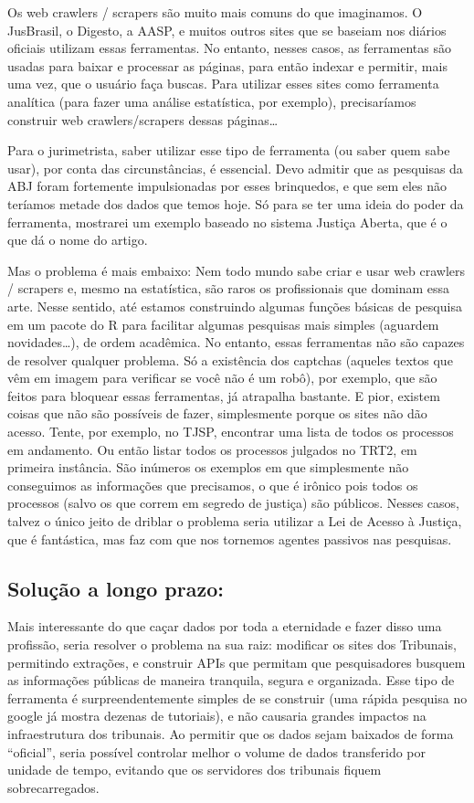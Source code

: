 \documentclass[]{book}
\begin{document}
Os web crawlers / scrapers são muito mais comuns do que imaginamos. O
JusBrasil, o Digesto, a AASP, e muitos outros sites que se baseiam nos
diários oficiais utilizam essas ferramentas. No entanto, nesses casos,
as ferramentas são usadas para baixar e processar as páginas, para então
indexar e permitir, mais uma vez, que o usuário faça buscas. Para
utilizar esses sites como ferramenta analítica (para fazer uma análise
estatística, por exemplo), precisaríamos construir web crawlers/scrapers
dessas páginas\ldots{}

Para o jurimetrista, saber utilizar esse tipo de ferramenta (ou saber
quem sabe usar), por conta das circunstâncias, é essencial. Devo admitir
que as pesquisas da ABJ foram fortemente impulsionadas por esses
brinquedos, e que sem eles não teríamos metade dos dados que temos hoje.
Só para se ter uma ideia do poder da ferramenta, mostrarei um exemplo
baseado no sistema Justiça Aberta, que é o que dá o nome do artigo.

Mas o problema é mais embaixo: Nem todo mundo sabe criar e usar web
crawlers / scrapers e, mesmo na estatística, são raros os profissionais
que dominam essa arte. Nesse sentido, até estamos construindo algumas
funções básicas de pesquisa em um pacote do R para facilitar algumas
pesquisas mais simples (aguardem novidades\ldots{}), de ordem acadêmica.
No entanto, essas ferramentas não são capazes de resolver qualquer
problema. Só a existência dos captchas (aqueles textos que vêm em imagem
para verificar se você não é um robô), por exemplo, que são feitos para
bloquear essas ferramentas, já atrapalha bastante. E pior, existem
coisas que não são possíveis de fazer, simplesmente porque os sites não
dão acesso. Tente, por exemplo, no TJSP, encontrar uma lista de todos os
processos em andamento. Ou então listar todos os processos julgados no
TRT2, em primeira instância. São inúmeros os exemplos em que
simplesmente não conseguimos as informações que precisamos, o que é
irônico pois todos os processos (salvo os que correm em segredo de
justiça) são públicos. Nesses casos, talvez o único jeito de driblar o
problema seria utilizar a Lei de Acesso à Justiça, que é fantástica, mas
faz com que nos tornemos agentes passivos nas pesquisas.

\subsection{Solução a longo prazo:}\label{solucao-a-longo-prazo}

Mais interessante do que caçar dados por toda a eternidade e fazer disso
uma profissão, seria resolver o problema na sua raiz: modificar os sites
dos Tribunais, permitindo extrações, e construir APIs que permitam que
pesquisadores busquem as informações públicas de maneira tranquila,
segura e organizada. Esse tipo de ferramenta é surpreendentemente
simples de se construir (uma rápida pesquisa no google já mostra dezenas
de tutoriais), e não causaria grandes impactos na infraestrutura dos
tribunais. Ao permitir que os dados sejam baixados de forma ``oficial'',
seria possível controlar melhor o volume de dados transferido por
unidade de tempo, evitando que os servidores dos tribunais fiquem
sobrecarregados.
\end{document}
